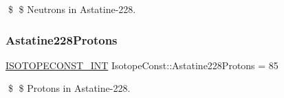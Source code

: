 \$ \$ Neutrons in Astatine-\/228. \mbox{\label{group___isotope_const-_astatine-_at228_gaf65e2731d004df15af9e16dfffce0fb1}} 
\subsubsection{\texorpdfstring{Astatine228\+Protons}{Astatine228Protons}}
{\footnotesize\ttfamily \mbox{\hyperlink{group___isotope_const-_macros_ga5f18360b3e99483a35c32d789e62621c}{I\+S\+O\+T\+O\+P\+E\+C\+O\+N\+S\+T\+\_\+\+I\+NT}} Isotope\+Const\+::\+Astatine228\+Protons = 85}

\$ \$ Protons in Astatine-\/228. 